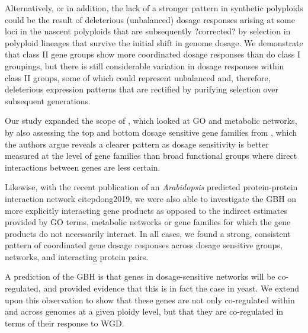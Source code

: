 \documentclass[11pt]{article}
\begin{document}
Alternatively, or in addition, the lack of a stronger pattern in synthetic polyploids could be the result of deleterious (unbalanced) dosage responses arising at some loci in the nascent polyploids that are subsequently ?corrected? by selection in polyploid lineages that survive the initial shift in genome dosage. We demonstrate that class II gene groups show more coordinated dosage responses than do class I groupings, but there is still considerable variation in dosage responses within class II groups, some of which could represent unbalanced and, therefore, deleterious expression patterns that are rectified by purifying selection over subsequent generations.

Our study expanded the scope of \cite{coate2016}, which looked at GO and metabolic networks, by also assessing the top and bottom dosage sensitive gene families from \cite{tasdighian2017}, which the authors argue reveals a clearer pattern as dosage sensitivity is better measured at the level of gene families than broad functional groups where direct interactions between genes are less certain.

Likewise, with the recent publication of an {\it Arabidopsis} predicted protein-protein interaction network citep{dong2019}, we were also able to investigate the GBH on more explicitly interacting gene products as opposed to the indirect estimates provided by GO terms, metabolic networks or gene families for which the gene products do not necessarily interact. In all cases, we found a strong, consistent pattern of coordinated gene dosage responses across dosage sensitive groups, networks, and interacting protein pairs.

A prediction of the GBH is that genes in dosage-sensitive networks will be co-regulated, and \cite{papp2003} provided evidence that this is in fact the case in yeast.
We extend upon this observation to show that these genes are not only co-regulated within and across genomes at a given ploidy level, but that they are co-regulated in terms of their response to WGD.
\end{document}
